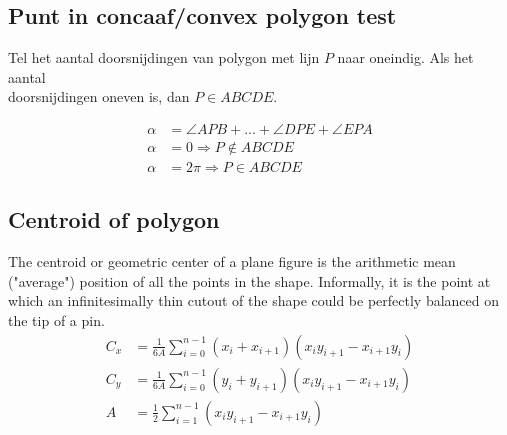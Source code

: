 \documentclass[a4paper, twocolumn]{article}
\newcommand{\point}[4]{\draw[fill] (#1,#2) circle (1pt) node[#4] {#3}}
\begin{document}
\subsection*{Punt in concaaf/convex polygon test}
Tel het aantal doorsnijdingen van polygon met lijn $P$ naar oneindig. Als het
aantal \\ doorsnijdingen oneven is, dan $P \in ABCDE$. \\
\begin{minipage}{.45\linewidth}
	\begin{align*}
	\alpha &= \angle APB + ... + \angle DPE + \angle EPA \\
	\alpha &= 0 \Rightarrow P \notin ABCDE \\
	\alpha &= 2\pi \Rightarrow P \in ABCDE
	\end{align*}
\end{minipage}\hfill%
\begin{minipage}{.5\linewidth}
	\centering
\end{minipage}

\vspace{-1.8em}
\subsection*{Centroid of polygon} \vspace{-0.3em}
The centroid or geometric center of a plane figure is the arithmetic mean
("average") position of all the points in the shape. Informally, it is the point
at which an infinitesimally thin cutout of the shape could be perfectly balanced
on the tip of a pin.
\vspace{-0.5em}
\begin{align*}
C_x &= \frac{1}{6A}\sum_{i=0}^{n-1}(x_i+x_{i+1})(x_iy_{i+1}-x_{i+1}y_i) \\
C_y &= \frac{1}{6A}\sum_{i=0}^{n-1}(y_i+y_{i+1})(x_iy_{i+1}-x_{i+1}y_i) \\
A   &= \frac{1}{2}\sum_{i=1}^{n-1}(x_iy_{i+1}-x_{i+1}y_i)
\end{align*}
\end{document}
